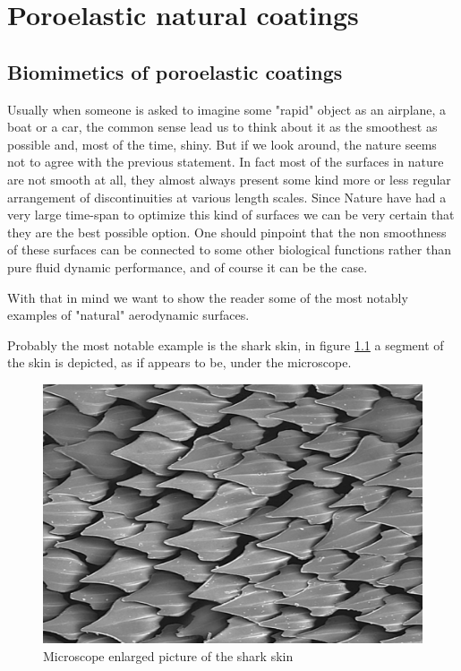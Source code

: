 \chapter{Poroelastic natural coatings}


\section{Biomimetics of poroelastic coatings}

Usually when someone is asked to imagine some "rapid" object as an airplane, a boat or a car, the common sense lead us to think about it as the smoothest as possible and, most of the time, shiny.
But if we look around, the nature seems not to agree with the previous statement.
In fact most of the surfaces in nature are not smooth at all, they almost always present some kind more or less regular arrangement of discontinuities at various length scales.
Since Nature have had a very large time-span to optimize this kind of surfaces we can be very certain that they are the best possible option.
One should pinpoint that the non smoothness of these surfaces can be connected to some other biological functions rather than pure fluid dynamic performance, and of course it can be the case.

With that in mind we want to show the reader some of the most notably examples of "natural" aerodynamic surfaces.

Probably the most notable example is the shark skin, in figure \ref{fig:shark} a segment of the skin is depicted, as if appears to be, under the microscope.

\begin{figure}[h]
	\centering
	\includegraphics[width=0.6\linewidth]{chapter_1/shark}
	\caption{Microscope enlarged picture of the shark skin}
	\label{fig:shark}
\end{figure}

